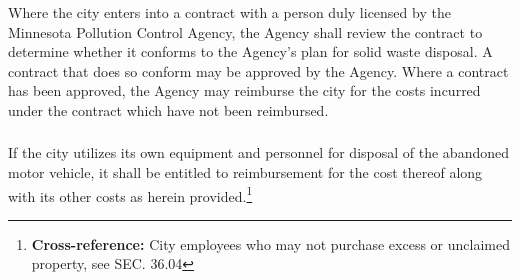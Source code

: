 \subsubsection{}
Where the city enters into a contract with a person duly licensed by the Minnesota Pollution Control Agency, the Agency shall review the contract to determine whether it conforms to the Agency’s plan for solid waste disposal.  A contract that does so conform may be approved by the Agency.  Where a contract has been approved, the Agency may reimburse the city for the costs incurred under the contract which have not been reimbursed.
\subsubsection{}
If the city utilizes its own equipment and personnel for disposal of the abandoned motor vehicle, it shall be entitled to reimbursement for the cost thereof along with its other costs as herein provided.\footnote{\textbf{Cross-reference:} City employees who may not purchase excess or unclaimed property, see SEC. 36.04}
